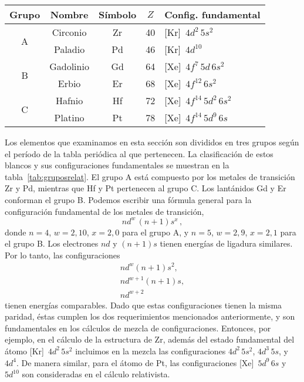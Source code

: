 \begin{table*}[t]
\centering
\begin{tabular}{|c|c|c|c|l|}
\hline
Grupo & Nombre   & Símbolo & $Z$ & Config. fundamental \\
\hline
\hline
\multirow{2}{*}{A} & Circonio & Zr & 40 & [Kr]~$4d^2\,5s^2$ \\
                   & Paladio  & Pd & 46 & [Kr]~$4d^{10}$ \\
\hline
\multirow{2}{*}{B} & Gadolinio & Gd & 64 & [Xe]~$4f^7\,5d\,6s^2$ \\
                   & Erbio     & Er & 68 & [Xe]~$4f^{12}\,6s^2$ \\
\hline
\multirow{2}{*}{C} & Hafnio  & Hf & 72 & [Xe]~$4f^{14}\,5d^2\,6s^2$ \\
                   & Platino & Pt & 78 & [Xe]~$4f^{14}\,5d^9\,6s$ \\
\hline
\end{tabular}
\caption[Blancos relativistas y sus configuraciones fundamentales]
{Blancos relativistas y sus configuraciones fundamentales.}
\label{tab:gruposrelat} 
\end{table*}

Los elementos que examinamos en esta sección son divididos en tres 
grupos según el período de la tabla periódica al que pertenecen. La 
clasificación de estos blancos y sus configuraciones fundamentales se
muestran en la tabla~\ref{tab:gruposrelat}. El grupo A está compuesto 
por los metales de transición Zr y Pd, mientras que Hf y Pt pertenecen 
al grupo C. Los lantánidos Gd y Er conforman el grupo B. 
Podemos escribir una fórmula general para la configuración fundamental 
de los metales de transición, 
\begin{equation}
nd^w\,(n+1)s^x\,,
\end{equation}
donde $n=4$, $w=2,10$, $x=2,0$ para el grupo A, y $n=5$, $w=2,9$, 
$x=2,1$ para el grupo B. Los electrones $nd$ y $(n+1)s$ tienen energías 
de ligadura similares. Por lo tanto, las configuraciones 
\begin{gather}
nd^w(n+1)s^2, \\
nd^{w+1}(n+1)s, \\
nd^{w+2}
\end{gather}
tienen energías comparables. Dado que estas configuraciones tienen la 
misma paridad, éstas cumplen los dos requerimientos mencionados 
anteriormente, y son fundamentales en los cálculos de mezcla de 
configuraciones. Entonces, por ejemplo, en el cálculo de la estructura 
de Zr, además del estado fundamental del átomo [Kr]~$4d^2\,5s^2$ 
incluimos en la mezcla las configuraciones $4d^2\,5s^2$, $4d^3\,5s$, y 
$4d^4$. De manera similar, para el átomo de Pt, las configuraciones
[Xe]~$5d^9\,6s$ y $5d^{10}$ son consideradas en el cálculo relativista.

